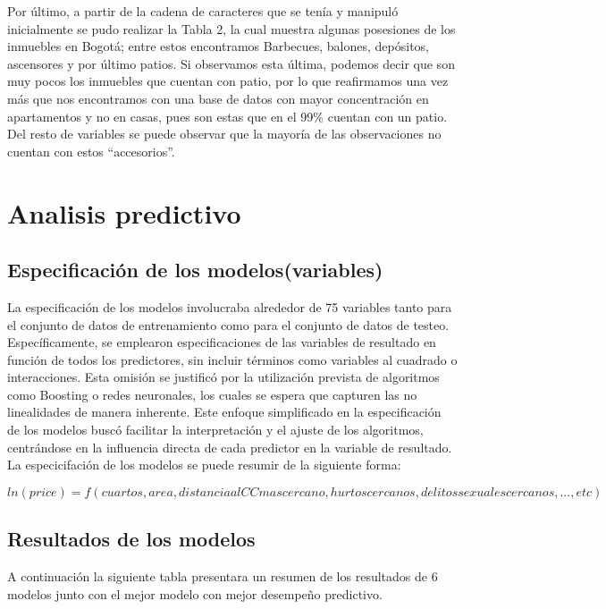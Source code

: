 \documentclass[10pt]{article}
\begin{document}


Por último, a partir de la cadena de caracteres que se tenía y manipuló inicialmente se pudo realizar la Tabla 2, la cual muestra algunas posesiones de los inmuebles en Bogotá; entre estos encontramos Barbecues, balones, depósitos, ascensores y por último patios. Si observamos esta última, podemos decir que son muy pocos los inmuebles que cuentan con patio, por lo que reafirmamos una vez más que nos encontramos con una base de datos con mayor concentración en apartamentos y no en casas, pues son estas que en el 99\% cuentan con un patio. Del resto de variables se puede observar que la mayoría de las observaciones no cuentan con estos “accesorios”.

\section{Analisis predictivo}

\subsection{Especificación de los modelos(variables)}

La especificación de los modelos involucraba alrededor de 75 variables tanto para el conjunto de datos de entrenamiento como para el conjunto de datos de testeo. Específicamente, se emplearon especificaciones de las variables de resultado en función de todos los predictores, sin incluir términos como variables al cuadrado o interacciones. Esta omisión se justificó por la utilización prevista de algoritmos como Boosting o redes neuronales, los cuales se espera que capturen las no linealidades de manera inherente. Este enfoque simplificado en la especificación de los modelos buscó facilitar la interpretación y el ajuste de los algoritmos, centrándose en la influencia directa de cada predictor en la variable de resultado. La especicifación de los modelos se puede resumir de la siguiente forma:

$$ln(price)=f(cuartos, area, distancia al CC mas cercano, hurtos cercanos, delitos sexuales cercanos, ..., etc)$$

\subsection{Resultados de los modelos}

A continuación la siguiente tabla presentara un resumen de los resultados de 6 modelos junto con el mejor modelo con mejor desempeño predictivo.
\end{document}
